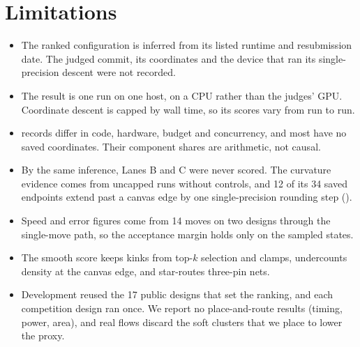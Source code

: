 \section{Limitations}\label{sec:limitations}

\begin{itemize}[leftmargin=1.4em,topsep=0.2em,itemsep=0.2em]
  \item The ranked configuration is inferred from its listed runtime and resubmission
        date. The judged commit, its coordinates and the device that ran its
        single-precision descent were not recorded.
  \item The \reproduction{} result is one run on one host, on a CPU rather than the
        judges' GPU. Coordinate descent is capped by wall time, so its scores vary
        from run to run.
  \item \historical{} records differ in code, hardware, budget and concurrency, and
        most have no saved coordinates. Their component shares are arithmetic, not
        causal.
  \item By the same inference, Lanes B and C were never scored. The curvature
        evidence comes from uncapped runs without controls, and 12 of its 34 saved
        endpoints extend past a canvas edge by one single-precision rounding step
        (\measurement).
  \item Speed and error figures come from 14 moves on two designs through the
        single-move path, so the acceptance margin holds only on the sampled states.
  \item The smooth score keeps kinks from top-$k$ selection and clamps, undercounts
        density at the canvas edge, and star-routes three-pin nets.
  \item Development reused the 17 public designs that set the ranking, and each
        competition design ran once. We report no place-and-route results (timing,
        power, area), and real flows discard the soft clusters that we place to lower
        the proxy.
\end{itemize}
